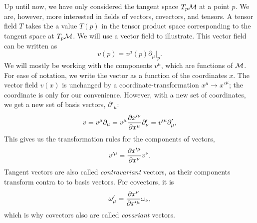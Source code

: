 Up until now, we have only considered the tangent space $T_p \mathcal{M}$ at a point $p$.
We are, however, more interested in fields of vectors, covectors, and tensors.
A tensor field $T$ takes the a value $T(p)$ in the tensor product space corresponding to the tangent space at $T_p \mathcal{M}$.
We will use a vector field to illustrate.
This vector field can be written as
%
\begin{equation}
    v(p) = v^\mu(p) \partial_\mu |_p. 
\end{equation}
%
We will mostly be working with the components $v^\mu$, which are functions of $\mathcal{M}$.
For ease of notation, we write the vector as a function of the coordinates $x$.
The vector field $v(x)$ is unchanged by a coordinate-transformation $x^\mu \rightarrow {x'}^\mu$; the coordinate is only for our convenience.
However, with a new set of coordinates, we get a new set of basis vectors, $\partial'_\mu$:
%
\begin{equation}
    v = v^\mu \partial_\mu = v^\mu \diffp{x'^\nu}{x^\mu} \partial'_\nu
    = v'^\mu \partial_\mu',
\end{equation}
%
This gives us the transformation rules for the components of vectors,
%
\begin{equation}
    v'^\mu = \diffp{x'^\mu}{x^\nu} v^\nu.
\end{equation}
%
Tangent vectors are also called \emph{contravariant} vectors, as their components transform contra to to basis vectors.
For covectors, it is
%
\begin{equation}
    \omega'_\mu = \diffp{x^\nu}{x'^\mu} \omega_\nu,
\end{equation}
%
which is why covectors also are called \emph{covariant} vectors.

